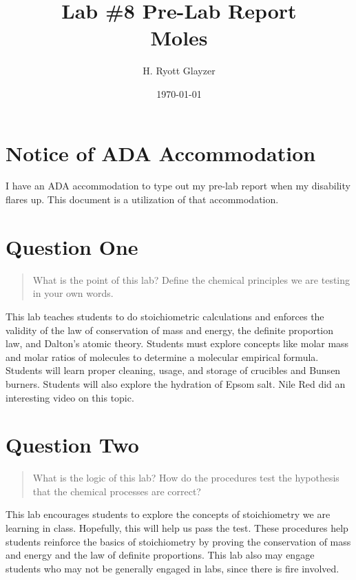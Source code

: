 \documentclass[12pt, letterpaper]{article}
\begin{document}


\title{Lab \#8 Pre-Lab Report \\ \large Moles}
\author{H. Ryott Glayzer}
\date{\today}


\maketitle


\section*{Notice of ADA Accommodation}
I have an ADA accommodation to type out my pre-lab report when my disability flares up.
This document is a utilization of that accommodation.

\section{Question One}
\begin{quote}
    What is the point of this lab? Define the chemical principles we are testing in your own words.
\end{quote}
This lab teaches students to do stoichiometric calculations and enforces the validity of 
the law of conservation of mass and energy, the definite proportion law, and Dalton's atomic
theory.
Students must explore concepts like molar mass and molar ratios of molecules to determine
a molecular empirical formula. 
Students will learn proper cleaning, usage, and storage of crucibles and Bunsen burners.
Students will also explore the hydration of Epsom salt. 
Nile Red did an interesting video on this topic.

\section{Question Two}
\begin{quote}
    What is the logic of this lab? How do the procedures test the hypothesis that the chemical 
    processes are correct?
\end{quote}
This lab encourages students to explore the concepts of stoichiometry we are learning in class.
Hopefully, this will help us pass the test. 
These procedures help students reinforce the basics of stoichiometry by proving the conservation
of mass and energy and the law of definite proportions.
This lab also may engage students who may not be generally engaged in labs, since there is 
fire involved.
\end{document}
